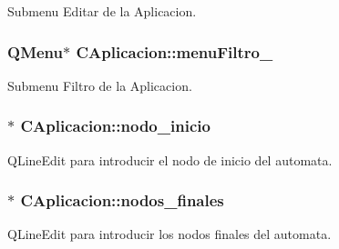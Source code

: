 Submenu Editar de la Aplicacion. 

\subsubsection[{\texorpdfstring{menu\+Filtro\+\_\+}{menuFiltro_}}]{\setlength{\rightskip}{0pt plus 5cm}Q\+Menu$\ast$ C\+Aplicacion\+::menu\+Filtro\+\_\+\hspace{0.3cm}{\ttfamily [private]}}\hypertarget{classCAplicacion_af9dedeec60356a055cb899e5f8a447b8}{}\label{classCAplicacion_af9dedeec60356a055cb899e5f8a447b8}


Submenu Filtro de la Aplicacion. 

\subsubsection[{\texorpdfstring{nodo\+\_\+inicio}{nodo_inicio}}]{$\ast$ C\+Aplicacion\+::nodo\+\_\+inicio\hspace{0.3cm}{\ttfamily [private]}}\hypertarget{classCAplicacion_a9d3e345fc25efeaf8a160daf22206a8e}{}\label{classCAplicacion_a9d3e345fc25efeaf8a160daf22206a8e}


Q\+Line\+Edit para introducir el nodo de inicio del automata. 

\subsubsection[{\texorpdfstring{nodos\+\_\+finales}{nodos_finales}}]{$\ast$ C\+Aplicacion\+::nodos\+\_\+finales\hspace{0.3cm}{\ttfamily [private]}}\hypertarget{classCAplicacion_a483026f954a5a26ddd9ded5863c61b9a}{}\label{classCAplicacion_a483026f954a5a26ddd9ded5863c61b9a}


Q\+Line\+Edit para introducir los nodos finales del automata. 

